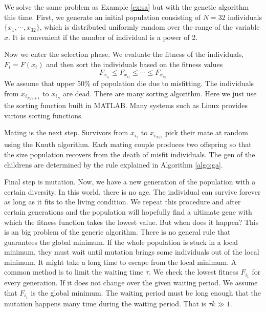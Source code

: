 \bigskip
\begin{example}\label{ex:ga}

We solve the same problem as Example \ref{ex:sa} but with the genetic algorithm this time.
First, we generate an initial population consisting of $N=32$ individuals $\{x_1, \cdots, x_{32}\}$, which is distributed uniformly random over the range of the variable $x$.   It is convenient if the number of individual is a power of 2.

Now we enter the selection phase. We evaluate the fitness of the individuals, $F_i=F(x_i)$ and then sort the individuals based on the fitness values
\begin{equation}
F_{x_{i_1}} \le F_{x_{i_2}} \le \cdots \le F_{x_{i_N}}
\end{equation}
We assume that upper 50\% of population die due to misfitting.  The individuals from $x_{i_{N/2+1}}$ to $x_{i_N}$ are dead.
There are many sorting algorithm.  Here we just use the sorting function built in MATLAB.  Many systems such as Linux provides various sorting functions.

Mating is the next step. Survivors from $x_{i_1}$ to $x_{i_{N/2}}$ pick their mate at random using the Knuth algorithm. 
Each mating couple produces two offspring so that the size population recovers from the death of misfit individuals.  The gen of the childrens are determined by the rule explained in Algorithm \ref{algo:ga}.

Final step is mutation.
Now, we have a new generation of the population with a certain diversity.  In this world, there is no age. The individual can survive forever as long as it fits to the living condition.  We repeat this procedure and after certain generations and the population will hopefully find a ultimate gene with which the fitness function takes the lowest value.  But when does it happen?  This is an big problem of the generic algorithm.  There is no general rule that guarantees the global minimum. If the whole population is stuck in a local minimum, they must wait until mutation brings some individuals out of the local minimum.  It might take a long time to escape from the local minimum.  A common method is to limit the waiting time $\tau$.  We check the lowest fitness $F_{i_1}$ for every generation.  If it does not change over the given waiting period.  We assume that $F_{i_1}$ is the global minimum.  The waiting period must be long enough that the mutation happens many time during the waiting period.  That is $\tau k\gg 1$.


\end{example}
